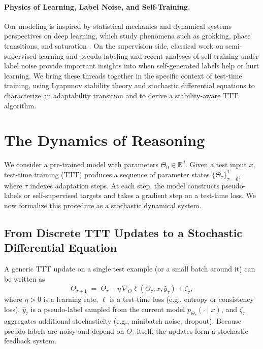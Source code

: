 \documentclass{article}
\theoremstyle{plain}
\theoremstyle{definition}
\theoremstyle{remark}
\newcommand{\R}{\mathbb{R}}
\begin{document}
\paragraph{Physics of Learning, Label Noise, and Self-Training.}
Our modeling is inspired by statistical mechanics and dynamical systems perspectives on deep learning, which study phenomena such as grokking, phase transitions, and saturation \cite{power2022grokking,bahri2024statmech,liu2024physics,merrill2024saturation}. On the supervision side, classical work on semi-supervised learning and pseudo-labeling \cite{yaroslavsky2010selftraining,lee2013pseudolabel,chapelle2006ssl,grandvalet2005entropy,sohn2020fixmatch,zhai2019s4l} and recent analyses of self-training under label noise \cite{chen2024understanding,kumar2024consistency} provide important insights into when self-generated labels help or hurt learning. We bring these threads together in the specific context of test-time training, using Lyapunov stability theory and stochastic differential equations \cite{strogatz2018,khalil2002lyapunov,welling2011bayesian,borkar2000ode} to characterize an adaptability transition and to derive a stability-aware TTT algorithm.


\section{The Dynamics of Reasoning}
\label{sec:theory}


We consider a pre-trained model with parameters $\Theta_0 \in \R^d$. Given a test input $x$, test-time training (TTT) produces a sequence of parameter states $\{\Theta_\tau\}_{\tau=0}^{T}$, where $\tau$ indexes adaptation steps. At each step, the model constructs pseudo-labels or self-supervised targets and takes a gradient step on a test-time loss. We now formalize this procedure as a stochastic dynamical system.

\subsection{From Discrete TTT Updates to a Stochastic Differential Equation}

A generic TTT update on a single test example (or a small batch around it) can be written as
\begin{equation}
    \Theta_{\tau+1}
    \;=\;
    \Theta_{\tau} - \eta \,\nabla_{\Theta} \ell(\Theta_{\tau}; x, \hat{y}_{\tau}) + \zeta_{\tau},
    \label{eq:discrete-update}
\end{equation}
where $\eta>0$ is a learning rate, $\ell$ is a test-time loss (e.g., entropy or consistency loss), $\hat{y}_{\tau}$ is a pseudo-label sampled from the current model $p_{\Theta_{\tau}}(\cdot \mid x)$, and $\zeta_{\tau}$ aggregates additional stochasticity (e.g., minibatch noise, dropout). Because pseudo-labels are noisy and depend on $\Theta_{\tau}$ itself, the updates form a stochastic feedback system.
\end{document}
